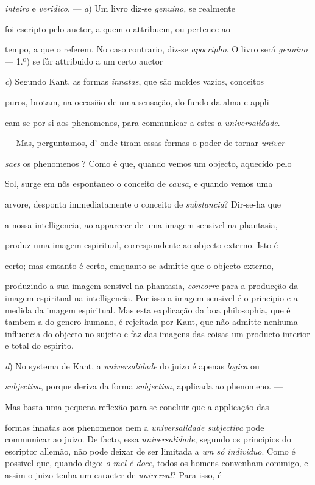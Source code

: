 \emph{inteiro} e \emph{veridico}. --- \emph{a}) Um livro diz-se \emph{genuino,} se realmente

foi escripto pelo auctor, a quem o attribuem, ou pertence ao

tempo, a que o referem. No caso contrario, diz-se \emph{apocripho}. O livro será \emph{genuino} --- 1.º) se fôr attribuido a um certo auctor

\emph{c}) Segundo Kant, as formas \emph{innatas}, que são moldes vazios, conceitos

puros, brotam, na occasião de uma sensação, do fundo da alma e appli-

cam-se por si aos phenomenos, para communicar a estes a \emph{universalidade}.

--- Mas, perguntamos, d' onde tiram essas formas o poder de tornar \emph{univer-}

\emph{saes} os phenomenos ? Como é que, quando vemos um objecto, aquecido pelo

Sol, surge em nôs espontaneo o conceito de \emph{causa}, e quando vemos uma

arvore, desponta immediatamente o conceito de \emph{substancia}? Dir-se-ha que

a nossa intelligencia, ao apparecer de uma imagem sensivel na phantasia,

produz uma imagem espiritual, correspondente ao objecto externo. Isto é

certo; mas emtanto é certo, emquanto se admitte que o objecto externo,

produzindo a sua imagem sensivel na phantasia, \emph{concorre} para a producção da imagem espiritual na intelligencia. Por isso a imagem sensivel é o principio e a medida da imagem espiritual. Mas esta explicação da boa philosophia, que é tambem a do genero humano, é rejeitada por Kant, que não admitte nenhuma influencia do objecto no sujeito e faz das imagens das coisas um producto interior e total do espirito.

\emph{d}) No systema de Kant, a \emph{universalidade} do juizo é apenas \emph{logica} ou

\emph{subjectiva}, porque deriva da forma \emph{subjectiva}, applicada ao phenomeno. ---

Mas basta uma pequena reflexão para se concluir que a applicação das

formas innatas aos phenomenos nem a \emph{universalidade subjectiva} pode communicar ao juizo. De facto, essa \emph{universalidade}, segundo os principios do escriptor allemão, não pode deixar de ser limitada a \emph{um só individuo}. Como é possivel que, quando digo: \emph{o mel é doce}, todos os homens convenham commigo, e assim o juizo tenha um caracter de \emph{universal}? Para isso, é

